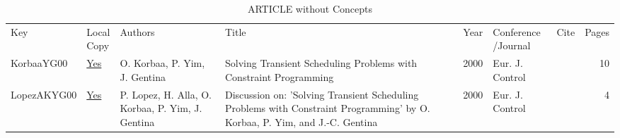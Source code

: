 {\scriptsize
\begin{longtable}{llp{5cm}p{10cm}rp{3cm}lr}
\rowcolor{white}\caption{ARTICLE without Concepts}\\ \toprule
\rowcolor{white}Key & \shortstack{Local\\Copy} & Authors & Title & Year & \shortstack{Conference\\/Journal} & Cite & Pages\\ \midrule
\endhead
\bottomrule
\endfoot
KorbaaYG00 & \href{works/KorbaaYG00.pdf}{Yes} & O. Korbaa, P. Yim, J. Gentina & Solving Transient Scheduling Problems with Constraint Programming & 2000 & Eur. J. Control & \cite{KorbaaYG00} & 10\\LopezAKYG00 & \href{works/LopezAKYG00.pdf}{Yes} & P. Lopez, H. Alla, O. Korbaa, P. Yim, J. Gentina & Discussion on: 'Solving Transient Scheduling Problems with Constraint Programming' by O. Korbaa, P. Yim, and {J.-C.} Gentina & 2000 & Eur. J. Control & \cite{LopezAKYG00} & 4\\\end{longtable}
}

